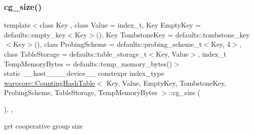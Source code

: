 \subsubsection{\texorpdfstring{cg\+\_\+size()}{cg\_size()}}
{\footnotesize\ttfamily template$<$class Key , class Value  = index\+\_\+t, Key Empty\+Key = defaults\+::empty\+\_\+key$<$\+Key$>$(), Key Tombstone\+Key = defaults\+::tombstone\+\_\+key$<$\+Key$>$(), class Probing\+Scheme  = defaults\+::probing\+\_\+scheme\+\_\+t$<$\+Key, 4$>$, class Table\+Storage  = defaults\+::table\+\_\+storage\+\_\+t$<$\+Key, Value$>$, index\+\_\+t Temp\+Memory\+Bytes = defaults\+::temp\+\_\+memory\+\_\+bytes()$>$ \\
static \+\_\+\+\_\+host\+\_\+\+\_\+\+\_\+\+\_\+device\+\_\+\+\_\+ constexpr index\+\_\+type \hyperlink{classwarpcore_1_1CountingHashTable}{warpcore\+::\+Counting\+Hash\+Table}$<$ Key, Value, Empty\+Key, Tombstone\+Key, Probing\+Scheme, Table\+Storage, Temp\+Memory\+Bytes $>$\+::cg\+\_\+size (\begin{DoxyParamCaption}{ }\end{DoxyParamCaption})\hspace{0.3cm}{\ttfamily [inline]}, {\ttfamily [static]}, {\ttfamily [noexcept]}}



get cooperative group size 

